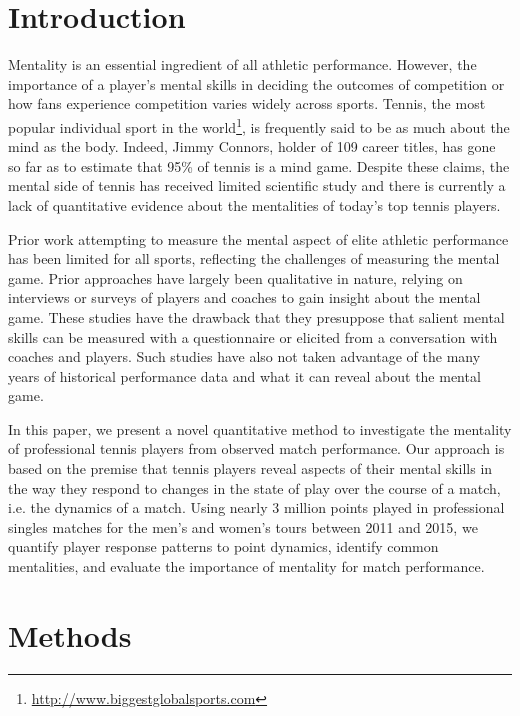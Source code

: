 \documentclass{Latex/svjour3}
\begin{document}
\section{Introduction}

Mentality is an essential ingredient of all athletic performance. However, the
importance of a player's mental skills in deciding the outcomes of competition
or how fans experience competition varies widely across sports. Tennis, the most
popular individual sport in the
world\footnote{\url{http://www.biggestglobalsports.com}}, is frequently said to
be as much about the mind as the body. Indeed, Jimmy Connors, holder of 109
career titles, has gone so far as to estimate that 95\% of tennis is a mind
game\cite{samulski2007tennis}. Despite these claims, the mental side of tennis
has received limited scientific study and there is currently a lack of
quantitative evidence about the mentalities of today's top tennis players.

Prior work attempting to measure the mental aspect of elite athletic performance
has been limited for all sports, reflecting the challenges of measuring the
mental game. Prior approaches have largely been qualitative in nature, relying
on interviews\cite{young2011understanding} or surveys\cite{taylor1987predicting}
of players and coaches to gain insight about the mental game. These studies have
the drawback that they presuppose that salient mental skills can be measured
with a questionnaire or elicited from a conversation with coaches and
players. Such studies have also not taken advantage of the many years of
historical performance data and what it can reveal about the mental
game. 

In this paper, we present a novel quantitative method to investigate the
mentality of professional tennis players from observed match performance. Our
approach is based on the premise that tennis players reveal aspects of their
mental skills in the way they respond to changes in the state of play over the
course of a match, i.e. the dynamics of a match. Using nearly 3 million points
played in professional singles matches for the men's and women's tours between
2011 and 2015, we quantify player response patterns to point dynamics, identify
common mentalities, and evaluate the importance of mentality for match
performance.


\section{Methods}
\end{document}
